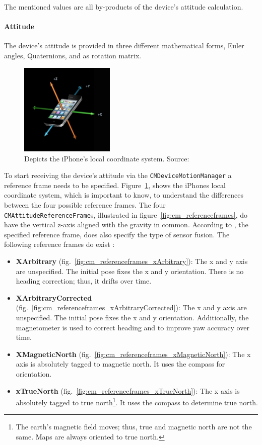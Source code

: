 The mentioned values are all by-products of the device's attitude calculation.

\paragraph{Attitude} The device's attitude is provided in three different mathematical forms, Euler angles, Quaternions, and as rotation matrix.

\begin{center}
  \begin{figure}
    \includegraphics[width=0.4\textwidth]{figures/iphone_coordinatesystem}
    \caption{Depicts the iPhone's local coordinate system. Source:~\citep{apple:wwdc_2012_pham}}
    \label{fig:iphone_cs}
  \end{figure}
\end{center}

To start receiving the device's attitude via the \texttt{CMDeviceMotionManager} a reference frame needs to be specified. Figure~\ref{fig:iphone_cs}, shows the iPhones local coordinate system, which is important to know, to understand the differences between the four possible reference frames. The four \texttt{CMAttitudeReferenceFrame}s, illustrated in figure~\ref{fig:cm_referenceframes}, do have the vertical z-axis aligned with the gravity in common. According to \citet{apple:wwdc_2014_pham}, the specified reference frame, does also specify the type of sensor fusion. The following reference frames do exist \citep{apple:wwdc_2014_pham,apple:ios_doc_cm}:
\begin{itemize}
  \item \textbf{XArbitrary} (fig.~\ref{fig:cm_referenceframes_xArbitrary}): The x and y axis are unspecified. The initial pose fixes the x and y orientation. There is no heading correction; thus, it drifts over time.
  \item \textbf{XArbitraryCorrected} (fig.~\ref{fig:cm_referenceframes_xArbitraryCorrected}): The x and y axis are unspecified. The initial pose fixes the x and y orientation. Additionally, the magnetometer is used to correct heading and to improve yaw accuracy over time.
  \item \textbf{XMagneticNorth} (fig.~\ref{fig:cm_referenceframes_xMagneticNorth}): The x axis is absolutely tagged to magnetic north. It uses the compass for orientation.
  \item \textbf{xTrueNorth} (fig.~\ref{fig:cm_referenceframes_xTrueNorth}): The x axis is absolutely tagged to true north\footnote{The earth's magnetic field moves; thus, true and magnetic north are not the same. Maps are always oriented to true north.}. It uses the compass to determine true north.
\end{itemize}

